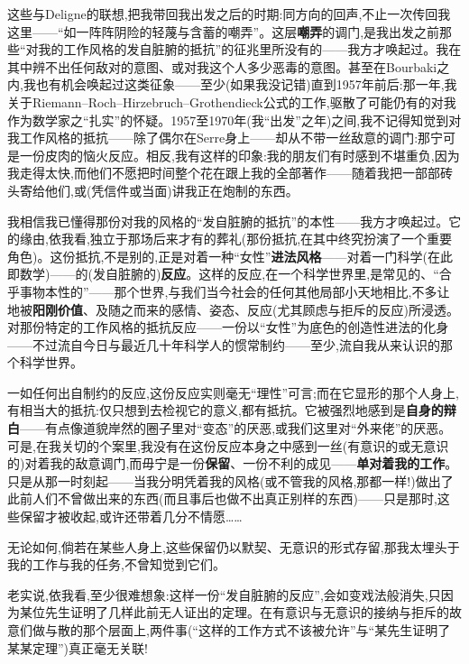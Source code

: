 \dmark{}这些与Deligne的联想,把我带回我出发之后的时期:同方向的回声,不止一次传回我这里——“如一阵阵阴险的轻蔑与含蓄的嘲弄”。这层\textbf{嘲弄}的调门,是我出发之前那些“对我的工作风格的发自脏腑的抵抗”的征兆里所没有的——我方才唤起过。我在其中辨不出任何敌对的意图、或对我这个人多少恶毒的意图。甚至在Bourbaki之内,我也有机会唤起过这类征象——至少(如果我没记错)直到1957年前后:那一年,我关于Riemann--Roch--Hirzebruch--Grothendieck公式的工作,驱散了可能仍有的对我作为数学家之“扎实”的怀疑。1957至1970年(我“出发”之年)之间,我不记得知觉到对我工作风格的抵抗——除了偶尔在Serre身上——却从不带一丝敌意的调门:那宁可是一份皮肉的恼火反应。相反,我有这样的印象:我的朋友们有时感到不堪重负,因为我走得太快,而他们不愿把时间整个花在跟上我的全部著作——随着我把一部部砖头寄给他们,或(凭信件或当面)讲我正在炮制的东西。

我相信我已懂得那份对我的风格的“发自脏腑的抵抗”的本性——我方才唤起过。它的缘由,依我看,独立于那场后来才有的葬礼(那份抵抗,在其中终究扮演了一个重要角色)。这份抵抗,不是别的,正是对着一种“女性”\textbf{进法风格}——对着一门科学(在此即数学)——的(发自脏腑的)\textbf{反应}。这样的反应,在一个科学世界里,是常见的、“合乎事物本性的”——那个世界,与我们当今社会的任何其他局部小天地相比,不多让地被\textbf{阳刚价值}、及随之而来的感情、姿态、反应(尤其顾虑与拒斥的反应)所浸透。对那份特定的工作风格的抵抗反应——一份以“女性”为底色的创造性进法的化身——不过流自今日与最近几十年科学人的惯常制约——至少,流自我从来认识的那个科学世界。

一如任何出自制约的反应,这份反应实则毫无“理性”可言;而在它显形的那个人身上,有\dmark{}相当大的抵抗:仅只想到去检视它的意义,都有抵抗。它被强烈地感到是\textbf{自身的辩白}——有点像道貌岸然的圈子里对“变态”的厌恶,或我们这里对“外来佬”的厌恶。可是,在我关切的个案里,我没有在这份反应本身之中感到一丝(有意识的或无意识的)对着我的敌意调门,而毋宁是一份\textbf{保留}、一份不利的成见——\textbf{单对着我的工作}。只是从那一时刻起——当我分明凭着我的风格(或不管我的风格,那都一样!)做出了此前人们不曾做出来的东西(而且事后也做不出真正别样的东西)——只是那时,这些保留才被收起,或许还带着几分不情愿……

无论如何,倘若在某些人身上,这些保留仍以默契、无意识的形式存留,那我太埋头于我的工作与我的任务,不曾知觉到它们。

老实说,依我看,至少很难想象:这样一份“发自脏腑的反应”,会如变戏法般消失,只因为某位先生证明了几样此前无人证出的定理。在有意识与无意识的接纳与拒斥的故意们做与散的那个层面上,两件事(“这样的工作方式不该被允许”与“某先生证明了某某定理”)真正毫无关联!

